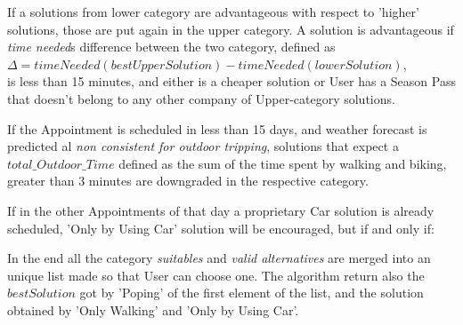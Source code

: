	If a solutions from lower category are advantageous with respect to 'higher' solutions, those are put again in the upper category.
	A solution is advantageous if \textit{time needed}s difference between the two category, defined as 
	\\ \quad $\Delta =  timeNeeded(bestUpperSolution) - timeNeeded(lowerSolution)$, \\
	is less than 15 minutes, and either is a cheaper solution or User has a Season Pass that doesn't belong to any other company of Upper-category solutions.
		
	If the Appointment is scheduled in less than 15 days, and weather forecast is predicted al \textit{non consistent for outdoor tripping}, solutions that expect a $total\_Outdoor\_Time$ defined as the sum of the time spent by walking and biking, greater than 3 minutes are downgraded in the respective category.

	If in the other Appointments of that day a proprietary Car solution is already scheduled, 'Only by Using Car' solution will be encouraged, but if and only if:

	In the end all the category \textit{suitables} and \textit{valid alternatives} are merged into an unique list made so that User can choose one.
	The algorithm return also the $bestSolution$ got by 'Poping' of the first element of the list, and the solution obtained by 'Only Walking' and 'Only by Using Car'.
	
	\vfill
	
	\vfill